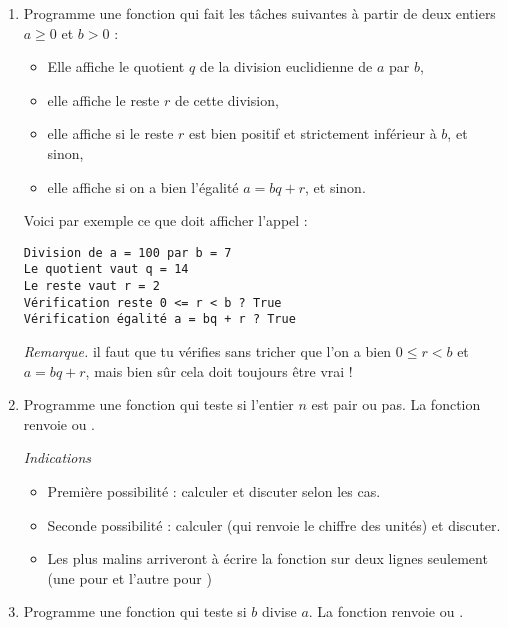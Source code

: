 \documentclass[11pt,class=report,crop=false]{standalone}
\begin{document}

\begin{activite}



\begin{enumerate}
  \item Programme une fonction  qui fait les tâches suivantes à partir de deux entiers $a\ge0$ et $b>0$ :
  \begin{itemize}
    \item Elle affiche le quotient $q$ de la division euclidienne de $a$ par $b$,
    \item elle affiche le reste $r$ de cette division,
    \item elle affiche  si le reste $r$ est bien positif et strictement inférieur à $b$, et  sinon,
    \item elle affiche  si on a bien l'égalité $a = bq+r$, et  sinon.
   \end{itemize}
    
Voici par exemple ce que doit afficher l'appel   :
\begin{lstlisting}  
Division de a = 100 par b = 7
Le quotient vaut q = 14
Le reste vaut r = 2
Vérification reste 0 <= r < b ? True
Vérification égalité a = bq + r ? True
\end{lstlisting}

\emph{Remarque.} il faut que tu vérifies sans tricher que l'on a bien $0 \le r<b$ et $a=bq+r$, mais bien sûr cela doit toujours être vrai !
  
  
  \item Programme une fonction  qui teste si l'entier $n$ est pair ou pas. La fonction renvoie   ou .
  
  \emph{Indications}
  \begin{itemize}
    \item Première possibilité : calculer  et discuter selon les cas.
    \item Seconde possibilité : calculer  (qui renvoie le chiffre des unités) et discuter.
    \item Les plus malins arriveront à écrire la fonction sur deux lignes seulement (une pour  et l'autre pour )
   \end{itemize}
   
  \item  Programme une fonction  qui teste si $b$ divise $a$. La fonction renvoie  ou .
  
\end{enumerate}   
     
\end{activite}
\end{document}
